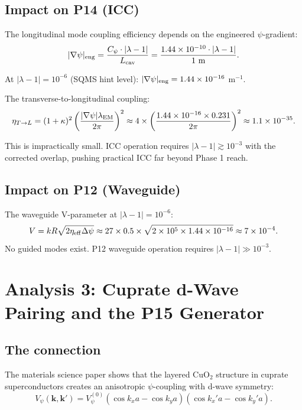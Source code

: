 \documentclass[11pt]{article}
\newcommand{\ee}[1]{\times 10^{#1}}
\begin{document}
\subsection{Impact on P14 (ICC)}

The longitudinal mode coupling efficiency depends on the engineered $\psi$-gradient:
\[
|\nabla\psi|_{\rm eng} = \frac{C_\psi \cdot |\lambda-1|}{L_{\rm cav}} = \frac{1.44\ee{-10} \cdot |\lambda-1|}{1\text{ m}}.
\]

At $|\lambda-1| = 10^{-6}$ (SQMS hint level):
$|\nabla\psi|_{\rm eng} = 1.44\ee{-16}$ m$^{-1}$.

The transverse-to-longitudinal coupling:
\[
\eta_{T\to L} = (1+\kappa)^2 \left(\frac{|\nabla\psi| \lambda_{\rm EM}}{2\pi}\right)^2 \approx 4 \times \left(\frac{1.44\ee{-16} \times 0.231}{2\pi}\right)^2 \approx 1.1\ee{-35}.
\]

This is impractically small. ICC operation requires $|\lambda-1| \gtrsim 10^{-3}$ with the corrected overlap, pushing practical ICC far beyond Phase 1 reach.

\subsection{Impact on P12 (Waveguide)}

The waveguide V-parameter at $|\lambda-1| = 10^{-6}$:
\[
V = kR\sqrt{2\eta_{\rm eff}\Delta\psi} \approx 27 \times 0.5 \times \sqrt{2 \times 10^5 \times 1.44\ee{-16}} \approx 7\ee{-4}.
\]
No guided modes exist. P12 waveguide operation requires $|\lambda-1| \gg 10^{-3}$.

\section{Analysis 3: Cuprate d-Wave Pairing and the P15 Generator}
\label{sec:cuprate-p15}

\subsection{The connection}

The materials science paper shows that the layered CuO$_2$ structure in cuprate superconductors creates an anisotropic $\psi$-coupling with d-wave symmetry:
\[
V_\psi(\mathbf{k}, \mathbf{k}') = V_\psi^{(0)}(\cos k_x a - \cos k_y a)(\cos k_x' a - \cos k_y' a).
\]
\end{document}
